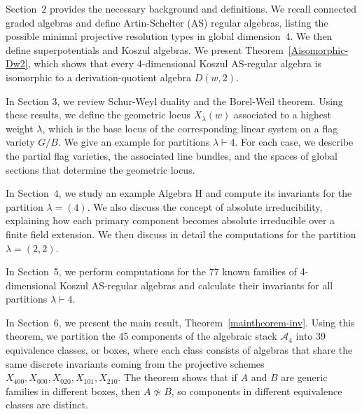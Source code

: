\documentclass{amsart}
\begin{document}
Section~2 provides the necessary background and definitions. We recall connected graded algebras and define Artin-Schelter (AS) regular algebras, listing the possible minimal projective resolution types in global dimension~4. We then define superpotentials and Koszul algebras. We present Theorem~\ref{Aisomorphic-Dw2}, which shows that every 4-dimensional Koszul AS-regular algebra is isomorphic to a derivation-quotient algebra \(D(w,2)\).

In Section 3, we review Schur-Weyl duality and the Borel-Weil theorem.
Using these results, we define the geometric locus $X_\lambda(w)$ associated to a highest weight $\lambda$, which is the base locus of the corresponding linear system on a flag variety $G/B.$ We give an example for partitions $\lambda \vdash 4$. For each case, we describe the partial flag varieties, the associated line bundles, 
and the spaces of global sections that determine the geometric locus.

In Section~4, we study an example Algebra H and compute its invariants for the partition \(\lambda = (4)\). We also discuss the concept of absolute irreducibility, explaining how each primary component becomes absolute irreducible over a finite field extension. 
We then discuss in detail the computations for the partition $\lambda = (2,2)$.

In Section~5, we perform computations for the 77 known families of 4-dimensional Koszul AS-regular algebras and calculate their invariants for all partitions $\lambda \vdash 4.$

In Section~6, we present the main result, Theorem~\ref{maintheorem-inv}. Using this theorem, we partition the 45 components of the algebraic stack \(\mathcal{A}_4\) into 39 equivalence classes, or boxes, where each class consists of algebras that share the same discrete invariants coming from the projective schemes \(X_{400}, X_{000}, X_{020}, X_{101}, X_{210}\). The theorem shows that if \(A\) and \(B\) are generic families in different boxes, then \(A \not\simeq B\), so components in different equivalence classes are distinct.
\end{document}
